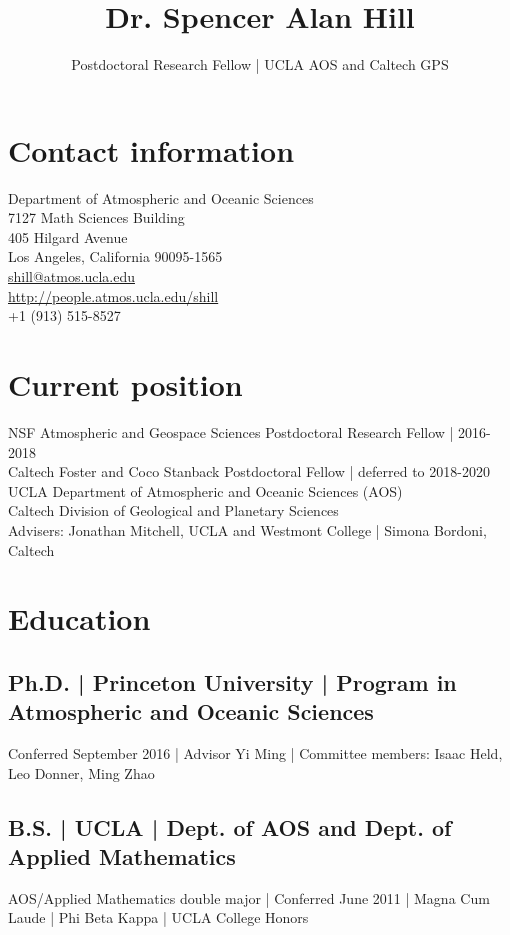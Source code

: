 \documentclass[12pt,letterpaper]{article}
\author{Postdoctoral Research Fellow | UCLA AOS and Caltech GPS}
\date{}
\title{Dr. Spencer Alan Hill}
\begin{document}
\maketitle
\section*{Contact information}
\label{sec:orgec104e8}
Department of Atmospheric and Oceanic Sciences\\
7127 Math Sciences Building\\
405 Hilgard Avenue\\
Los Angeles, California 90095-1565\\

\href{mailto:shill@atmos.ucla.edu}{shill@atmos.ucla.edu}\\
\url{http://people.atmos.ucla.edu/shill}\\
+1 (913) 515-8527
\section*{Current position}
\label{sec:org143b780}
NSF Atmospheric and Geospace Sciences Postdoctoral Research Fellow | 2016-2018\\
Caltech Foster and Coco Stanback Postdoctoral Fellow | deferred to 2018-2020\\
UCLA Department of Atmospheric and Oceanic Sciences (AOS)\\
Caltech Division of Geological and Planetary Sciences\\
Advisers: Jonathan Mitchell, UCLA and Westmont College | Simona Bordoni, Caltech\\
\section*{Education}
\label{sec:orge59557e}
\subsection*{Ph.D. | Princeton University | Program in Atmospheric and Oceanic Sciences}
\label{sec:orgde1f402}
Conferred September 2016 | Advisor Yi Ming | Committee members: Isaac
Held, Leo Donner, Ming Zhao
\subsection*{B.S. | UCLA | Dept. of AOS and Dept. of Applied Mathematics}
\label{sec:org3fe4494}
AOS/Applied Mathematics double major | Conferred June 2011 |
Magna Cum Laude | Phi Beta Kappa | UCLA College Honors
\end{document}
